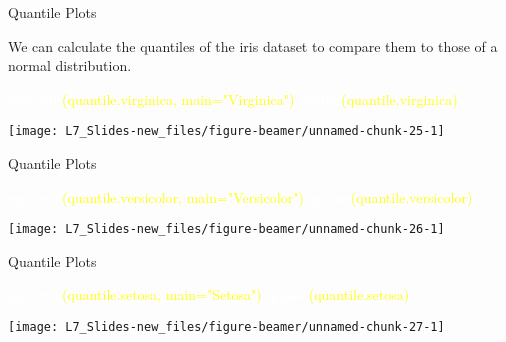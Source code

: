 \documentclass[ignorenonframetext,]{beamer}
\newenvironment{Shaded}{\begin{snugshade}}{\end{snugshade}}
\newcommand{\KeywordTok}[1]{\textcolor{white}{\textbf{{#1}}}}
\newcommand{\NormalTok}[1]{\textcolor{yellow}{{#1}}}
\newcommand{\DataTypeTok}[1]{\textcolor{yellow}{{#1}}}
\newcommand{\StringTok}[1]{\textcolor{yellow}{{#1}}}
\begin{document}
\begin{frame}[fragile]{Quantile Plots}

We can calculate the quantiles of the iris dataset to compare them to
those of a normal distribution.

\small

\small

\begin{Shaded}
\begin{Highlighting}[]
\KeywordTok{qqnorm}\NormalTok{(quantile.virginica, }\DataTypeTok{main=}\StringTok{"Virginica"}\NormalTok{)}
\KeywordTok{qqline}\NormalTok{(quantile.virginica)}
\end{Highlighting}
\end{Shaded}

\begin{center}\texttt{[image: L7\_Slides-new\_files/figure-beamer/unnamed-chunk-25-1]} \end{center}

\end{frame}

\begin{frame}[fragile]{Quantile Plots}

\small

\begin{Shaded}
\begin{Highlighting}[]
\KeywordTok{qqnorm}\NormalTok{(quantile.versicolor, }\DataTypeTok{main=}\StringTok{"Versicolor"}\NormalTok{)}
\KeywordTok{qqline}\NormalTok{(quantile.versicolor)}
\end{Highlighting}
\end{Shaded}

\begin{center}\texttt{[image: L7\_Slides-new\_files/figure-beamer/unnamed-chunk-26-1]} \end{center}

\end{frame}

\begin{frame}[fragile]{Quantile Plots}

\small

\begin{Shaded}
\begin{Highlighting}[]
\KeywordTok{qqnorm}\NormalTok{(quantile.setosa, }\DataTypeTok{main=}\StringTok{"Setosa"}\NormalTok{)}
\KeywordTok{qqline}\NormalTok{(quantile.setosa)}
\end{Highlighting}
\end{Shaded}

\begin{center}\texttt{[image: L7\_Slides-new\_files/figure-beamer/unnamed-chunk-27-1]} \end{center}

\end{frame}
\end{document}
